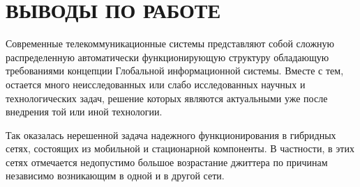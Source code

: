 \chapter*{ВЫВОДЫ ПО РАБОТЕ}
Современные телекоммуникационные системы представляют собой сложную распределенную автоматически функционирующую структуру обладающую требованиями концепции Глобальной информационной системы.
Вместе с тем, остается много неисследованных или слабо исследованных научных и технологических задач, решение которых являются актуальными уже после внедрения той или иной технологии.

Так оказалась нерешенной задача надежного функционирования в гибридных сетях, состоящих из мобильной и стационарной компоненты.
В частности, в этих сетях отмечается недопустимо большое возрастание джиттера по причинам независимо возникающим в одной и в другой сети.

